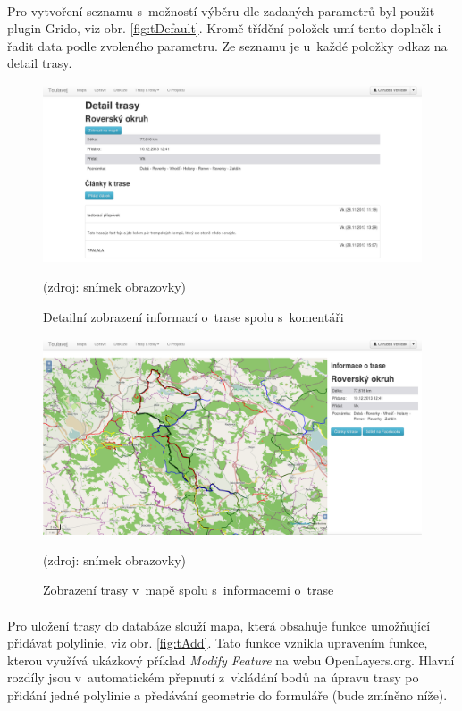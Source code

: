 \documentclass[11pt,a4paper,titlepage,oneside]{book}
\begin{document}
		\paragraph{} Pro vytvoření seznamu s~možností výběru dle zadaných parametrů byl použit plugin Grido, viz obr. \ref{fig:tDefault}. Kromě třídění položek umí tento doplněk i řadit data podle zvoleného parametru. Ze seznamu je u~každé položky odkaz na detail trasy.
		\begin{figure}[!h]
			\begin{center}
				\includegraphics[width=12cm]{obrazky/toulavej/trackDetail.png}
				\caption{Detailní zobrazení informací o~trase spolu s~komentáři}
				\label{fig:tDetail}
				(zdroj: snímek obrazovky)
			\end{center}
		\end{figure}
		\begin{figure}[!h]
			\begin{center}
				\includegraphics[width=12cm]{obrazky/toulavej/trackTrack.png}
				\caption{Zobrazení trasy v~mapě spolu s~informacemi o~trase}
				\label{fig:tTrack}
				(zdroj: snímek obrazovky)
			\end{center}
		\end{figure}
			\paragraph{} Pro uložení trasy do databáze slouží mapa, která obsahuje funkce umožňu\-jící přidávat polylinie, viz obr. \ref{fig:tAdd}. Tato funkce vznikla upravením funkce, kterou využívá ukázkový příklad \textit{Modify Feature} na webu OpenLayers.org\cite{ol}. Hlavní rozdíly jsou v~automatickém přepnutí z~vkládání bodů na úpravu trasy po přidání jedné polylinie a předávání geometrie do formuláře (bude zmíněno níže).
\end{document}
